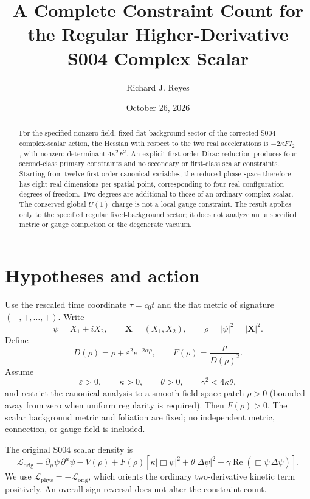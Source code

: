 \documentclass[11pt]{article}
\title{A Complete Constraint Count for the Regular Higher-Derivative S004 Complex Scalar}
\author{Richard J. Reyes}
\date{October 26, 2026}
\newcommand{\cL}{\mathcal{L}}
\newcommand{\bX}{\mathbf{X}}
\begin{document}
\maketitle

\begin{abstract}
For the specified nonzero-field, fixed-flat-background sector of the corrected
S004 complex-scalar action, the Hessian with respect to the two real
accelerations is $-2\kappa F I_2$, with nonzero determinant
$4\kappa^2F^2$. An explicit first-order Dirac reduction produces four
second-class primary constraints and no secondary or first-class scalar
constraints. Starting from twelve first-order canonical variables, the
reduced phase space therefore has eight real dimensions per spatial point,
corresponding to four real configuration degrees of freedom. Two degrees
are additional to those of an ordinary complex scalar. The conserved
global $U(1)$ charge is not a local gauge constraint. The result applies
only to the specified regular fixed-background sector; it does not
analyze an unspecified metric or gauge completion or the degenerate vacuum.
\end{abstract}

\section{Hypotheses and action}

Use the rescaled time coordinate $\tau=c_0t$ and the flat metric of
signature $(-,+,\ldots,+)$. Write
\begin{equation}
\psi=X_1+iX_2,\qquad \bX=(X_1,X_2),\qquad
\rho=|\psi|^2=|\bX|^2.
\end{equation}
Define
\begin{equation}
D(\rho)=\rho+\varepsilon^2e^{-2\alpha\rho},\qquad
F(\rho)=\frac{\rho}{D(\rho)^2}.
\end{equation}
Assume
\begin{equation}\label{eq:hyp}
\varepsilon>0,\qquad \kappa>0,\qquad\theta>0,
\qquad\gamma^2<4\kappa\theta,
\end{equation}
and restrict the canonical analysis to a smooth field-space patch
$\rho>0$ (bounded away from zero when uniform regularity is required).
Then $F(\rho)>0$. The scalar background metric and foliation are fixed;
no independent metric, connection, or gauge field is included.

The original S004 scalar density is
\begin{equation}\label{eq:original}
\cL_{\mathrm{orig}}=
\partial_\mu\bar\psi\,\partial^\mu\psi-V(\rho)
+F(\rho)\left[
\kappa|\Box\psi|^2+\theta|\Delta\psi|^2
+\gamma\operatorname{Re}(\Box\psi\,\overline{\Delta\psi})
\right].
\end{equation}
We use $\cL_{\mathrm{phys}}=-\cL_{\mathrm{orig}}$, which
orients the ordinary two-derivative kinetic term positively. An overall
sign reversal does not alter the constraint count.
\end{document}
